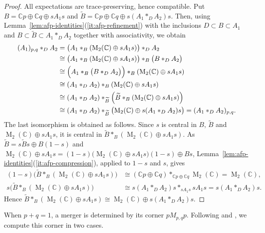 \documentclass[11pt]{amsart}
\numberwithin{equation}{section}
\newcommand{\cc}{\mathbb C}
\newcommand{\rM}{\operatorname{M}}
\theoremstyle{definition}
\begin{document}
\begin{proof}
    All expectations are trace-preserving, hence compatible. Put $B=\cc p\oplus\cc q\oplus sA_1s$ and $\widetilde{B}=\cc p\oplus\cc q\oplus s(A_1\ast_DA_2)s$. Then, using Lemma~\ref{lem:afp-identities}\textup{(\ref*{it:afp-refinement})} with the inclusions $D\subset B\subset A_1$ and $B\subset\widetilde{B}\subset A_1\ast_DA_2$ together with associativity, we obtain
    \begin{align*}
        (A_1)_{p,q}\ast_DA_2&
        =\bigl(A_1\ast_{B}(\rM_2(\cc)\oplus sA_1s)\bigr)\ast_DA_2\\
        &\cong\bigl(A_1\ast_{B}(\rM_2(\cc)\oplus sA_1s)\bigr)\ast_{B}\bigl(B\ast_DA_2\bigr)\\
        &\cong\Bigl(A_1\ast_{B}\bigl(B\ast_DA_2\bigr)\Bigr)\ast_{B}(\rM_2(\cc)\oplus sA_1s)\\
        &\cong(A_1\ast_DA_2)\ast_{B}(\rM_2(\cc)\oplus sA_1s)\\
        &\cong(A_1\ast_DA_2)\ast_{\widetilde{B}}\Bigl(\widetilde{B}\ast_{B}(\rM_2(\cc)\oplus sA_1s)\Bigr)\\
        &\cong(A_1\ast_DA_2)\ast_{\widetilde{B}}\bigl(\rM_2(\cc)\oplus s(A_1\ast_DA_2)s\bigr)=(A_1\ast_DA_2)_{p,q}.
        \end{align*}
 The last isomorphism is obtained as follows. Since $s$ is central in $B$, $\widetilde{B}$ and $\rM_2(\cc)\oplus sA_1s$, it is central in $\widetilde{B}\ast_{B}(\rM_2(\cc)\oplus sA_1s)$. As $\widetilde{B}=s\widetilde{B}s\oplus B(1-s)$ and $\rM_2(\cc)\oplus sA_1s=(1-s)\bigl(\rM_2(\cc)\oplus sA_1s\bigr)(1-s)\oplus Bs$, Lemma~\ref{lem:afp-identities}\textup{(\ref*{it:afp-compression})}, applied to $1-s$ and $s$, gives
    \begin{align*}
        (1-s)\bigl(\widetilde{B}\ast_{B}(\rM_2(\cc)\oplus sA_1s)\bigr)&\cong(\cc p\oplus\cc q)\ast_{\cc p\oplus\cc q}\rM_2(\cc)=\rM_2(\cc),\\
        s\bigl(\widetilde{B}\ast_{B}(\rM_2(\cc)\oplus sA_1s)\bigr)&\cong s(A_1\ast_DA_2)s\ast_{sA_1s}sA_1s=s(A_1\ast_DA_2)s.
    \end{align*}
    Hence $\widetilde{B}\ast_{B}(\rM_2(\cc)\oplus sA_1s)\cong\rM_2(\cc)\oplus s(A_1\ast_DA_2)s$.
\end{proof}

When $p+q=1$, a merger is determined by its corner $pM_{p,q}p$. Following \cite[Lemma~4.3]{Dy95} and \cite[Lemmas~2.4 and~2.7]{Re13}, we compute this corner in two cases.
\end{document}
